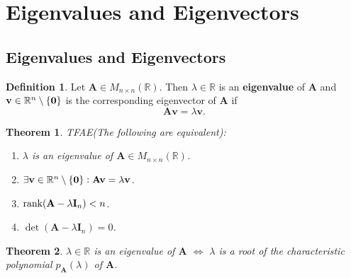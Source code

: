 \documentclass[12pt,openany]{book}
\newtheorem{theorem}{Theorem}[chapter]
\theoremstyle{definition}
\newtheorem{definition}{Definition}[chapter]
\newcommand{\R}{\mathbb{R}}
\newcommand{\by}{\times}
\newcommand{\rank}{\textnormal{rank}}
\renewcommand{\vec}[1]{\textbf{#1}}
\begin{document}
	\newpage
	\section{Eigenvalues and Eigenvectors}
	\subsection{Eigenvalues and Eigenvectors}
	\begin{tcolorbox}[colframe=defcolor,title={\color{white}\bf Eigenvalue and Eigenvetor}]
		\begin{definition}
			Let \(\textbf{A}\in M_{n\by n}(\R)\). Then \(\lambda\in\R\) is an \textbf{eigenvalue} of \(\textbf{A}\) and \(\textbf{v}\in\R^n\setminus\set{\textbf{0}}\) is the corresponding eigenvector of \(\textbf{A}\) if \[
			\textbf{Av}=\lambda\textbf{v}.
			\]
		\end{definition}
	\end{tcolorbox}
	\vspace{4pt}
	\begin{tcolorbox}[colframe=thmcolor,title={\color{white}\bf }]
		\begin{theorem}
			TFAE(The following are equivalent):
			\begin{enumerate}[(1)]
				\item \(\lambda\) is an eigenvalue of \(\textbf{A}\in M_{n\by n}(\R)\).
				\item \(\exists\vec{v}\in\R^n\setminus\set{\textnormal{\bf 0}}:\textbf{Av}=\lambda\vec{v}\).
				\item \(\rank(\textbf{A}-\lambda\textbf{I}_n)<n\).
				\item \(\det(\textbf{A}-\lambda\textbf{I}_n)=0\).
			\end{enumerate}
		\end{theorem}
	\end{tcolorbox}
	\vspace{4pt}
	\begin{tcolorbox}[colframe=thmcolor,title={\color{white}\bf }]
		\begin{theorem}
			\(\lambda\in\R\) is an eigenvalue of \(\textbf{A}\) \(\iff\) \(\lambda\) is a root of the characteristic polynomial \(p_\textbf{A}(\lambda)\) of \(\textbf{A}\).
		\end{theorem}
	\end{tcolorbox}
	\vspace{4pt}
\end{document}

